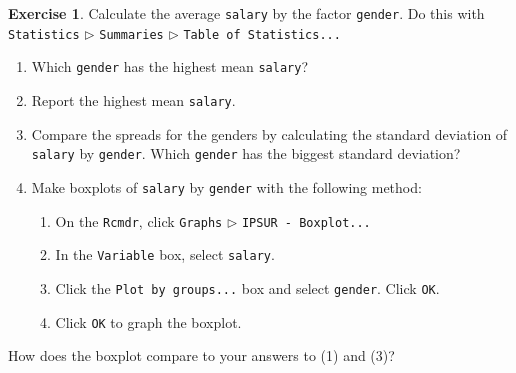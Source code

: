 \documentclass[]{book}
\providecommand{\tightlist}{%
  \setlength{\itemsep}{0pt}\setlength{\parskip}{0pt}}
\numberwithin{equation}{chapter}
\numberwithin{figure}{chapter}
\theoremstyle{plain}
\theoremstyle{definition}
\newtheorem{xca}{Exercise}[chapter]
\theoremstyle{remark}
\theoremstyle{definition}
\theoremstyle{definition}
\theoremstyle{remark}
\begin{document}
\begin{xca}
Calculate the average \texttt{salary} by the factor \texttt{gender}. Do
this with \texttt{Statistics} \(\triangleright\) \texttt{Summaries}
\(\triangleright\) \texttt{Table\ of\ Statistics...}

\begin{enumerate}
\def\labelenumi{\arabic{enumi}.}
\item
  Which \texttt{gender} has the highest mean \texttt{salary}?
\item
  Report the highest mean \texttt{salary}.
\item
  Compare the spreads for the genders by calculating the standard
  deviation of \texttt{salary} by \texttt{gender}. Which \texttt{gender}
  has the biggest standard deviation?
\item
  Make boxplots of \texttt{salary} by \texttt{gender} with the following
  method:

  \begin{enumerate}
  \def\labelenumii{\roman{enumii})}
  \tightlist
  \item
    On the \texttt{Rcmdr}, click \texttt{Graphs} \(\triangleright\)
    \texttt{IPSUR\ -\ Boxplot...}
  \item
    In the \texttt{Variable} box, select \texttt{salary}.
  \item
    Click the \texttt{Plot\ by\ groups...} box and select
    \texttt{gender}. Click \texttt{OK}.
  \item
    Click \texttt{OK} to graph the boxplot.
  \end{enumerate}
\end{enumerate}

How does the boxplot compare to your answers to (1) and (3)?
\end{xca}

\bigskip
\end{document}
